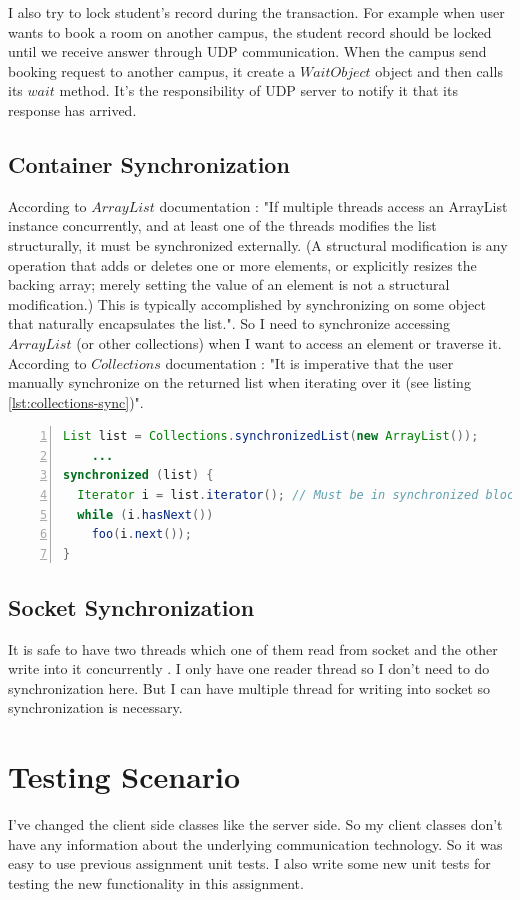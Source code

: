 \documentclass[12pt]{article}
\begin{document}
\par I also try to lock student's record during the transaction. For example when user wants to book a room on another campus, the student record should be locked until we receive answer through UDP communication. When the campus send booking request to another campus, it create a $WaitObject$ object and then calls its $wait$ method. It's the responsibility of UDP server to notify it that its response has arrived.

\subsection{Container Synchronization}
According to $ArrayList$ documentation \cite{ArrayList}: "If multiple threads access an ArrayList instance concurrently, and at least one of the threads modifies the list structurally, it must be synchronized externally. (A structural modification is any operation that adds or deletes one or more elements, or explicitly resizes the backing array; merely setting the value of an element is not a structural modification.) This is typically accomplished by synchronizing on some object that naturally encapsulates the list.". So I need to synchronize accessing $ArrayList$ (or other collections) when I want to access an element or traverse it. According to $Collections$ documentation \cite{Collections}: "It is imperative that the user manually synchronize on the returned list when iterating over it (see listing \ref{lst:collections-sync})".

\begin{lstlisting}[language=java,label={lst:collections-sync},caption={Collections Synchronization},numbers=left]
List list = Collections.synchronizedList(new ArrayList());
    ...
synchronized (list) {
  Iterator i = list.iterator(); // Must be in synchronized block
  while (i.hasNext())
    foo(i.next());
}
\end{lstlisting}

\subsection{Socket Synchronization}
It is safe to have two threads which one of them read from socket and the other write into it concurrently \cite{socket-full-duplex}. I only have one reader thread so I don't need to do synchronization here. But I can have multiple thread for writing into socket so synchronization is necessary.

\section{Testing Scenario}
I've changed the client side classes like the server side. So my client classes don't have any information about the underlying communication technology. So it was easy to use previous assignment unit tests. I also write some new unit tests for testing the new functionality in this assignment.
\end{document}
